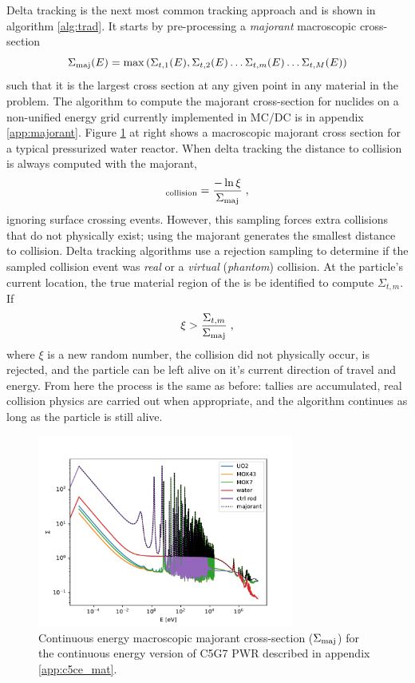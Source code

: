 Delta tracking is the next most common tracking approach and is shown in algorithm \ref{alg:trad}.
It starts by pre-processing a \textit{majorant} macroscopic cross-section
\begin{equation}
    \Sigma_{\text{maj}}(E) = \max\left({\Sigma_{t,1}(E), \Sigma_{t,2}(E) \dots \Sigma_{t,m}(E) \dots \Sigma_{t,M}(E)}\right)
\end{equation}
such that it is the largest cross section at any given point in any material in the problem.
The algorithm to compute the majorant cross-section for nuclides on a non-unified energy grid currently implemented in MC/DC is in appendix \ref{app:majorant}.
Figure \ref{fig:majorant_c5ce} at right shows a macroscopic majorant cross section for a typical pressurized water reactor.
When delta tracking the distance to collision is always computed with the majorant,
\begin{equation}
    _{\text{collision}} = \frac{-\ln{\xi}}{\Sigma_{\text{maj}}} \; ,
\end{equation}
ignoring surface crossing events.
However, this sampling forces extra collisions that do not physically exist; using the majorant generates the smallest distance to collision. Delta tracking algorithms use a rejection sampling to determine if the sampled collision event was \textit{real} or a \textit{virtual} (\textit{phantom}) collision.
At the particle's current location, the true material region of the is be identified to compute $\Sigma_{t,m}$.
If 
\begin{equation}
    \xi > \frac{\Sigma_{t,m}}{\Sigma_{\text{maj}}} \; ,
\end{equation}
where $\xi$ is a new random number, the collision did not physically occur, is rejected, and the particle can be left alive on it's current direction of travel and energy.
From here the process is the same as before: tallies are accumulated, real collision physics are carried out when appropriate, and the algorithm continues as long as the particle is still alive.

\begin{figure}
    \centering
    \includegraphics[width=0.75\textwidth]{figures/delta_figs/macro_majorant_c5ce.pdf}
    \caption{Continuous energy macroscopic majorant cross-section ($\Sigma_{\text{maj}}$) for the continuous energy version of C5G7 PWR described in appendix \ref{app:c5ce_mat}.}
    \label{fig:majorant_c5ce}
\end{figure}

